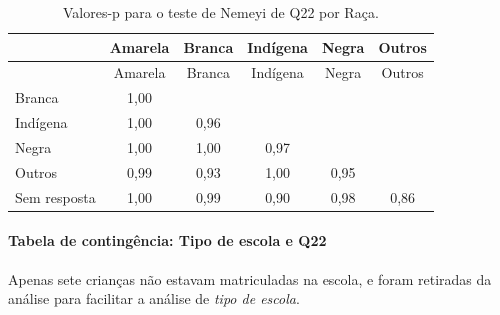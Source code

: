 \documentclass[]{article}
\let\oldparagraph\paragraph
\renewcommand{\paragraph}[1]{\oldparagraph{#1}\mbox{}}
\begin{document}
\begin{longtable}[]{@{}lccccc@{}}
\caption{\label{tab:unnamed-chunk-524}Valores-p para o teste de Nemeyi de Q22 por Raça.}\tabularnewline
\toprule
& Amarela & Branca & Indígena & Negra & Outros\tabularnewline
\midrule
\endfirsthead
\toprule
& Amarela & Branca & Indígena & Negra & Outros\tabularnewline
\midrule
\endhead
Branca & 1,00 & & & &\tabularnewline
Indígena & 1,00 & 0,96 & & &\tabularnewline
Negra & 1,00 & 1,00 & 0,97 & &\tabularnewline
Outros & 0,99 & 0,93 & 1,00 & 0,95 &\tabularnewline
Sem resposta & 1,00 & 0,99 & 0,90 & 0,98 & 0,86\tabularnewline
\bottomrule
\end{longtable}

\cleardoublepage

\hypertarget{tabela-de-continguxeancia-tipo-de-escola-e-q22}{%
\paragraph{Tabela de contingência: Tipo de escola e Q22}\label{tabela-de-continguxeancia-tipo-de-escola-e-q22}}

Apenas sete crianças não estavam matriculadas na escola, e foram retiradas da análise para facilitar a análise de \emph{tipo de escola}.
\end{document}
